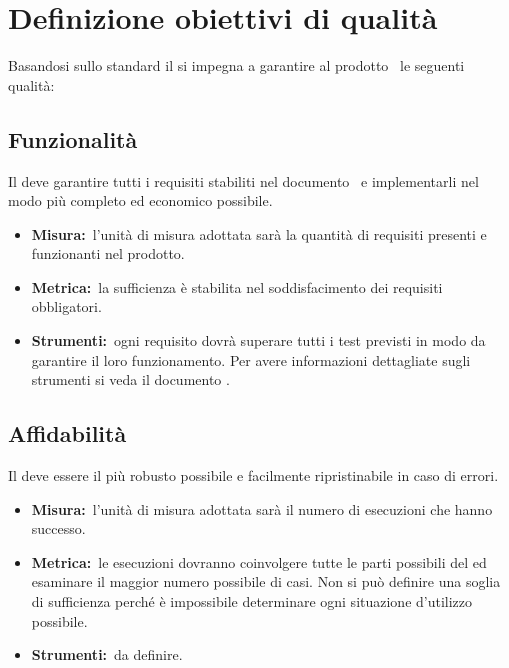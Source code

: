 
\section{Definizione obiettivi di qualità}
\label{sec:Definizione}
	Basandosi sullo standard  il  si impegna a garantire al prodotto \PROGETTO\ le seguenti qualità:
	\subsection{Funzionalità}
		Il  deve garantire tutti i requisiti stabiliti nel documento \ARdoc\ e implementarli nel modo più completo ed economico possibile.
		\begin{itemize}
			\item \textbf{Misura:}\ l'unità di misura adottata sarà la quantità di requisiti presenti e funzionanti nel prodotto.
			\item \textbf{Metrica:}\ la sufficienza è stabilita nel soddisfacimento dei requisiti obbligatori.
			\item \textbf{Strumenti:}\ ogni requisito dovrà superare tutti i test previsti in modo da garantire il loro funzionamento. Per avere informazioni dettagliate sugli strumenti si veda il documento \NPdoc. 
		\end{itemize}
	\subsection{Affidabilità}
		Il  deve essere il più robusto possibile e facilmente ripristinabile in caso di errori.
		\begin{itemize}
			\item \textbf{Misura:}\ l'unità di misura adottata sarà il numero di esecuzioni che hanno successo.
			\item \textbf{Metrica:}\ le esecuzioni dovranno coinvolgere tutte le parti possibili del  ed esaminare il maggior numero possibile di casi. Non si può definire una soglia di sufficienza perché è impossibile determinare ogni situazione d'utilizzo possibile.
			\item \textbf{Strumenti:}\ da definire.
		\end{itemize}
